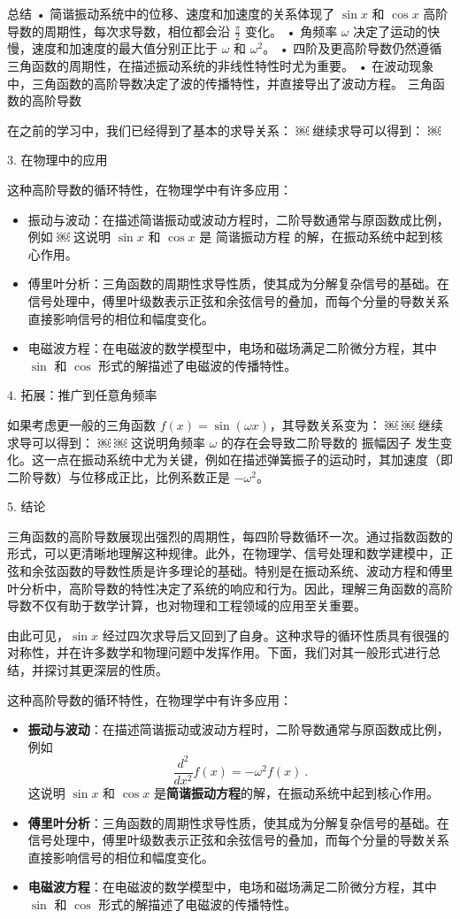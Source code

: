 总结
	•	简谐振动系统中的位移、速度和加速度的关系体现了 $\sin x$ 和 $\cos x$ 高阶导数的周期性，每次求导数，相位都会沿 $\frac{\pi}{2}$ 变化。
	•	角频率 $\omega$ 决定了运动的快慢，速度和加速度的最大值分别正比于 $\omega$ 和 $\omega^2$。
	•	四阶及更高阶导数仍然遵循三角函数的周期性，在描述振动系统的非线性特性时尤为重要。
	•	在波动现象中，三角函数的高阶导数决定了波的传播特性，并直接导出了波动方程。
三角函数的高阶导数

在之前的学习中，我们已经得到了基本的求导关系：
￼
继续求导可以得到：
￼



3. 在物理中的应用

这种高阶导数的循环特性，在物理学中有许多应用：
\begin{itemize}
\item 振动与波动：在描述简谐振动或波动方程时，二阶导数通常与原函数成比例，例如
￼
这说明 $\sin x$ 和 $\cos x$ 是 简谐振动方程 的解，在振动系统中起到核心作用。
\item 傅里叶分析：三角函数的周期性求导性质，使其成为分解复杂信号的基础。在信号处理中，傅里叶级数表示正弦和余弦信号的叠加，而每个分量的导数关系直接影响信号的相位和幅度变化。
\item 电磁波方程：在电磁波的数学模型中，电场和磁场满足二阶微分方程，其中 $\sin$ 和 $\cos$ 形式的解描述了电磁波的传播特性。
\end{itemize}

4. 拓展：推广到任意角频率

如果考虑更一般的三角函数 $f(x) = \sin(\omega x)$，其导数关系变为：
￼
￼
继续求导可以得到：
￼
￼
这说明角频率 $\omega$ 的存在会导致二阶导数的 振幅因子 发生变化。这一点在振动系统中尤为关键，例如在描述弹簧振子的运动时，其加速度（即二阶导数）与位移成正比，比例系数正是 $-\omega^2$。

5. 结论

三角函数的高阶导数展现出强烈的周期性，每四阶导数循环一次。通过指数函数的形式，可以更清晰地理解这种规律。此外，在物理学、信号处理和数学建模中，正弦和余弦函数的导数性质是许多理论的基础。特别是在振动系统、波动方程和傅里叶分析中，高阶导数的特性决定了系统的响应和行为。因此，理解三角函数的高阶导数不仅有助于数学计算，也对物理和工程领域的应用至关重要。

由此可见，$\sin x$ 经过四次求导后又回到了自身。这种求导的循环性质具有很强的对称性，并在许多数学和物理问题中发挥作用。下面，我们对其一般形式进行总结，并探讨其更深层的性质。


这种高阶导数的循环特性，在物理学中有许多应用：
\begin{itemize}
    \item \textbf{振动与波动}：在描述简谐振动或波动方程时，二阶导数通常与原函数成比例，例如
    \[
    \frac{d^2}{dx^2} f(x) = -\omega^2 f(x)~.
    \]
    这说明 $\sin x$ 和 $\cos x$ 是\textbf{简谐振动方程}的解，在振动系统中起到核心作用。
    \item \textbf{傅里叶分析}：三角函数的周期性求导性质，使其成为分解复杂信号的基础。在信号处理中，傅里叶级数表示正弦和余弦信号的叠加，而每个分量的导数关系直接影响信号的相位和幅度变化。
    \item \textbf{电磁波方程}：在电磁波的数学模型中，电场和磁场满足二阶微分方程，其中 $\sin$ 和 $\cos$ 形式的解描述了电磁波的传播特性。
\end{itemize}

